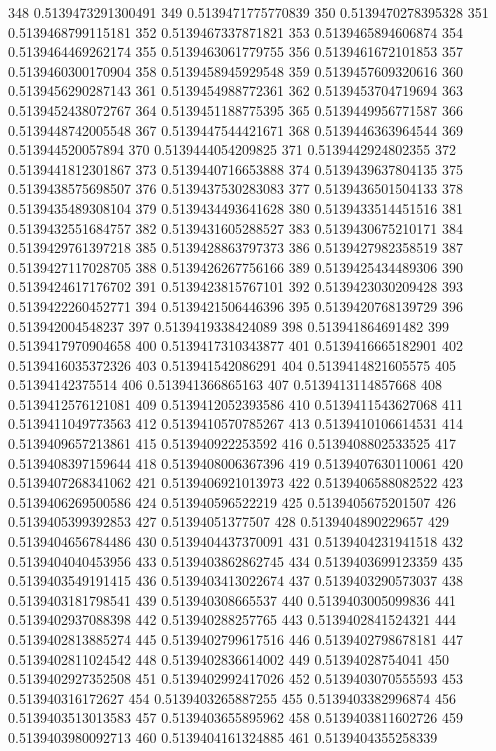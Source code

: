 348 0.5139473291300491
349 0.5139471775770839
350 0.5139470278395328
351 0.5139468799115181
352 0.5139467337871821
353 0.5139465894606874
354 0.5139464469262174
355 0.5139463061779755
356 0.5139461672101853
357 0.5139460300170904
358 0.5139458945929548
359 0.5139457609320616
360 0.5139456290287143
361 0.5139454988772361
362 0.5139453704719694
363 0.5139452438072767
364 0.5139451188775395
365 0.5139449956771587
366 0.5139448742005548
367 0.5139447544421671
368 0.5139446363964544
369 0.513944520057894
370 0.5139444054209825
371 0.5139442924802355
372 0.5139441812301867
373 0.5139440716653888
374 0.5139439637804135
375 0.5139438575698507
376 0.5139437530283083
377 0.5139436501504133
378 0.5139435489308104
379 0.5139434493641628
380 0.5139433514451516
381 0.5139432551684757
382 0.5139431605288527
383 0.5139430675210171
384 0.5139429761397218
385 0.5139428863797373
386 0.5139427982358519
387 0.5139427117028705
388 0.5139426267756166
389 0.5139425434489306
390 0.5139424617176702
391 0.5139423815767101
392 0.5139423030209428
393 0.5139422260452771
394 0.5139421506446396
395 0.5139420768139729
396 0.513942004548237
397 0.5139419338424089
398 0.513941864691482
399 0.5139417970904658
400 0.5139417310343877
401 0.5139416665182901
402 0.5139416035372326
403 0.513941542086291
404 0.5139414821605575
405 0.51394142375514
406 0.513941366865163
407 0.5139413114857668
408 0.5139412576121081
409 0.5139412052393586
410 0.5139411543627068
411 0.5139411049773563
412 0.5139410570785267
413 0.5139410106614531
414 0.5139409657213861
415 0.513940922253592
416 0.5139408802533525
417 0.5139408397159644
418 0.5139408006367396
419 0.5139407630110061
420 0.5139407268341062
421 0.5139406921013973
422 0.5139406588082522
423 0.5139406269500586
424 0.513940596522219
425 0.5139405675201507
426 0.5139405399392853
427 0.51394051377507
428 0.5139404890229657
429 0.5139404656784486
430 0.5139404437370091
431 0.5139404231941518
432 0.5139404040453956
433 0.5139403862862745
434 0.5139403699123359
435 0.5139403549191415
436 0.5139403413022674
437 0.5139403290573037
438 0.5139403181798541
439 0.513940308665537
440 0.5139403005099836
441 0.5139402937088398
442 0.513940288257765
443 0.5139402841524321
444 0.5139402813885274
445 0.5139402799617516
446 0.5139402798678181
447 0.5139402811024542
448 0.5139402836614002
449 0.51394028754041
450 0.5139402927352508
451 0.5139402992417026
452 0.5139403070555593
453 0.513940316172627
454 0.5139403265887255
455 0.5139403382996874
456 0.5139403513013583
457 0.5139403655895962
458 0.5139403811602726
459 0.5139403980092713
460 0.5139404161324885
461 0.5139404355258339

